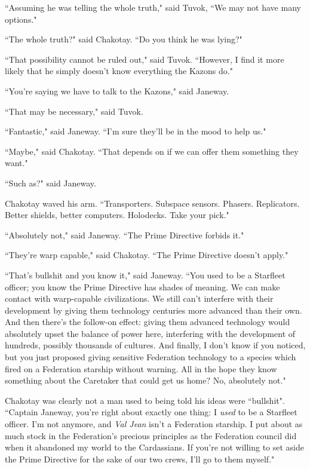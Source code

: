 \documentclass[twoside,letterpaper,12pt]{memoir}
\begin{document}
``Assuming he was telling the whole truth," said Tuvok, ``We may not have many options."

``The whole truth?" said Chakotay. ``Do you think he was lying?"

``That possibility cannot be ruled out," said Tuvok. ``However, I find it more likely that he simply doesn't know everything the Kazons do."

``You're saying we have to talk to the Kazons," said Janeway.

``That may be necessary," said Tuvok.

``Fantastic," said Janeway. ``I'm sure they'll be in the mood to help us."

``Maybe," said Chakotay. ``That depends on if we can offer them something they want."

``Such as?" said Janeway.

Chakotay waved his arm. ``Transporters. Subspace sensors. Phasers. Replicators. Better shields, better computers. Holodecks. Take your pick."

``Absolutely not," said Janeway. ``The Prime Directive forbids it."

``They're warp capable," said Chakotay. ``The Prime Directive doesn't apply."

``That's bullshit and you know it," said Janeway. ``You used to be a Starfleet officer; you know the Prime Directive has shades of meaning. We can make contact with warp-capable civilizations. We still can't interfere with their development by giving them technology centuries more advanced than their own. And then there's the follow-on effect: giving them advanced technology would absolutely upset the balance of power here, interfering with the development of hundreds, possibly thousands of cultures. And finally, I don't know if you noticed, but you just proposed giving sensitive Federation technology to a species which fired on a Federation starship without warning. All in the hope they know something about the Caretaker that could get us home? No, absolutely not."

Chakotay was clearly not a man used to being told his ideas were ``bullshit". ``Captain Janeway, you're right about exactly one thing: I \textit{used} to be a Starfleet officer. I'm not anymore, and \textit{Val Jean} isn't a Federation starship. I put about as much stock in the Federation's precious principles as the Federation council did when it abandoned my world to the Cardassians. If you're not willing to set aside the Prime Directive for the sake of our two crews, I'll go to them myself."
\end{document}
